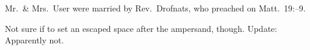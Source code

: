 Mr.\ \& Mrs.~User were married by Rev.\ Drofnats, who preached on Matt.\ 19\thinspace:--9.

Not sure if to set an escaped space after the ampersand, though.
Update: Apparently not.
